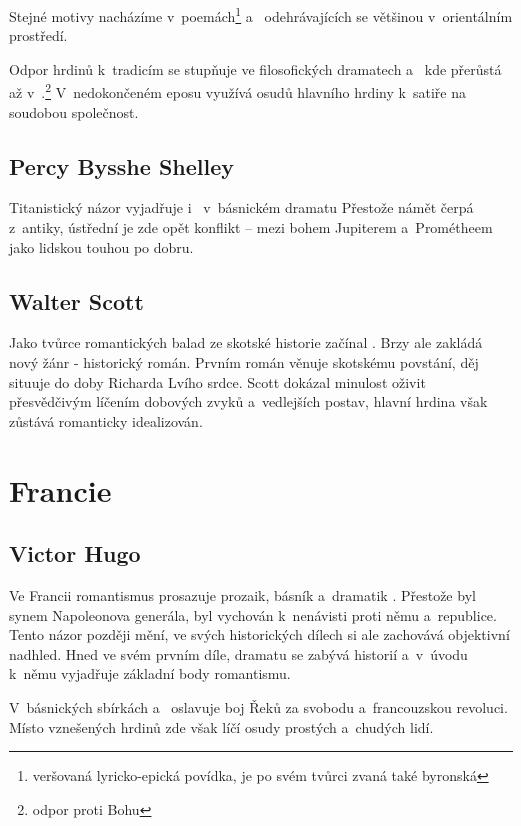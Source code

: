 Stejné motivy nacházíme v~poemách\footnote{veršovaná lyricko-epická
povídka, je po svém tvůrci zvaná také byronská} 
 a~ odehrávajících se většinou v~orientálním
prostředí.

Odpor hrdinů k~tradicím se stupňuje ve filosofických dramatech
 a~ kde přerůstá až
v~.\footnote{odpor proti Bohu} V~nedokončeném eposu
 využívá osudů hlavního hrdiny k~satiře na soudobou
společnost.

\subsection*{Percy Bysshe Shelley}
Titanistický názor vyjadřuje i~ v~básnickém
dramatu  Přestože námět čerpá z~antiky,
ústřední je zde opět konflikt -- mezi bohem Jupiterem a~Prométheem jako
lidskou touhou po dobru.

\subsection*{Walter Scott}
Jako tvůrce romantických balad ze skotské historie začínal . Brzy ale zakládá nový žánr - historický román. Prvním román
 věnuje skotskému povstání, děj  situuje do
doby Richarda Lvího srdce. Scott dokázal minulost oživit přesvědčivým
líčením dobových zvyků a~vedlejších postav, hlavní hrdina však zůstává
romanticky idealizován.

\section{Francie}
\subsection*{Victor Hugo}
Ve Francii romantismus prosazuje prozaik, básník a~dramatik .
Přestože byl synem Napoleonova generála, byl vychován k~nenávisti proti
němu a~republice. Tento názor později mění, ve svých historických dílech
si ale zachovává objektivní nadhled. Hned ve svém prvním díle, dramatu
 se zabývá historií a~v~úvodu k~němu vyjadřuje základní body
romantismu.

V~básnických sbírkách  a~
oslavuje boj Řeků za svobodu a~francouzskou revoluci. Místo vznešených
hrdinů zde však líčí osudy prostých a~chudých lidí.

